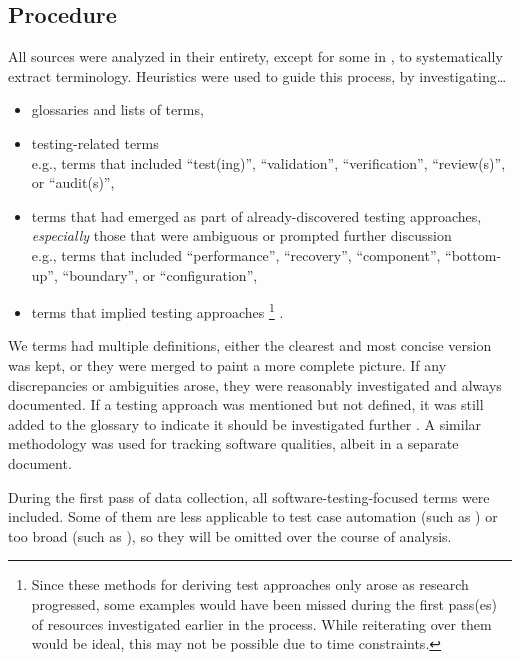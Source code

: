 \subsection{Procedure}

All sources were analyzed in their entirety, except for some in
, to systematically extract terminology.
Heuristics were used to guide this process, by investigating\dots

\begin{itemize}
      \item glossaries and lists of terms,
      \item testing-related terms\\
            e.g., terms that included ``test(ing)'', ``validation'',
            ``verification'', ``review(s)'', or ``audit(s)'',
      \item terms that had emerged as part of already-discovered
            testing approaches, \emph{especially} those that were ambiguous
            or prompted further discussion\\
            e.g., terms that included ``performance'', ``recovery'',
            ``component'', ``bottom-up'', ``boundary'', or ``configuration'',
      \item terms that implied testing approaches%
          \ifnotpaper\footnote{
                  Since these methods for deriving test approaches only arose
                  as research progressed, some examples would have been missed
                  during the first pass(es) of resources investigated earlier
                  in the process. While reiterating over them would be ideal,
                  this may not be possible due to time constraints.
            }%
            \fi%
            .
\end{itemize}

We terms had multiple definitions, either the clearest and most concise
version was kept, or they were merged to paint a more complete picture.
If any discrepancies or ambiguities
arose, they were reasonably investigated and always documented. If a
testing approach was mentioned but not defined, it was still added to the
glossary to indicate it should be investigated further%
. A similar methodology
was used for tracking software qualities, albeit in a separate
document.

During the first pass of data collection, all software-testing-focused terms
were included. Some of them are less applicable to test case automation
(such as \fi) or too
broad (such as \fi), so they
will be omitted over the course of analysis.

